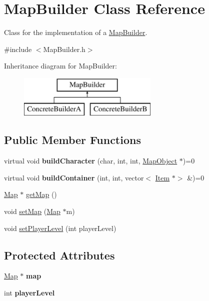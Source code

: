 \hypertarget{class_map_builder}{}\section{Map\+Builder Class Reference}
\label{class_map_builder}


Class for the implementation of a \hyperlink{class_map_builder}{Map\+Builder}.  




{\ttfamily \#include $<$Map\+Builder.\+h$>$}

Inheritance diagram for Map\+Builder\+:\begin{figure}[H]
\begin{center}
\leavevmode
\includegraphics[height=2.000000cm]{class_map_builder}
\end{center}
\end{figure}
\subsection*{Public Member Functions}
\begin{DoxyCompactItemize}
\item 
\hypertarget{class_map_builder_a15fd21ef4019954fd7a09c6c6d33de34}{}\label{class_map_builder_a15fd21ef4019954fd7a09c6c6d33de34} 
virtual void {\bfseries build\+Character} (char, int, int, \hyperlink{class_map_object}{Map\+Object} $\ast$)=0
\item 
\hypertarget{class_map_builder_a7c95f41ce6057ca116298837bb11795d}{}\label{class_map_builder_a7c95f41ce6057ca116298837bb11795d} 
virtual void {\bfseries build\+Container} (int, int, vector$<$ \hyperlink{class_item}{Item} $\ast$$>$ \&)=0
\item 
\hyperlink{class_map}{Map} $\ast$ \hyperlink{class_map_builder_a6ea698affc46e8fab291eaf7b3ae8547}{get\+Map} ()
\item 
void \hyperlink{class_map_builder_aa8a9483778deb9083c5704b557adefdd}{set\+Map} (\hyperlink{class_map}{Map} $\ast$m)
\item 
void \hyperlink{class_map_builder_a6d61977f2e49d1113c37352249f808c7}{set\+Player\+Level} (int player\+Level)
\end{DoxyCompactItemize}
\subsection*{Protected Attributes}
\begin{DoxyCompactItemize}
\item 
\hypertarget{class_map_builder_a92d737b9ed6aeb247ac5cf9b3f226f70}{}\label{class_map_builder_a92d737b9ed6aeb247ac5cf9b3f226f70} 
\hyperlink{class_map}{Map} $\ast$ {\bfseries map}
\item 
\hypertarget{class_map_builder_a8850fe2b8a73585561fd7ffcaef76555}{}\label{class_map_builder_a8850fe2b8a73585561fd7ffcaef76555} 
int {\bfseries player\+Level}
\end{DoxyCompactItemize}



